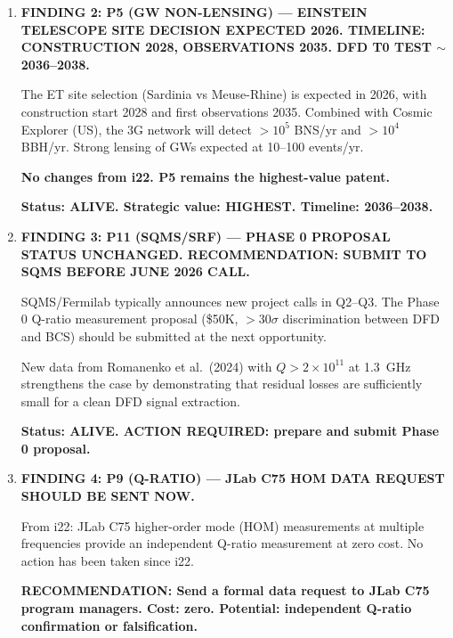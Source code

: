 \documentclass[11pt]{article}
\newcommand{\ee}[1]{\times 10^{#1}}
\begin{document}
\begin{tcolorbox}[colback=blue!5!white, colframe=blue!70!black,
  title=\textbf{W4i23 TOP 5 FINDINGS --- PATENT TEAM}]
\begin{enumerate}
  \textbf{FLAG: HIGH PRIORITY for author clarification.  The screening
  function is the key theoretical ingredient for ALL clock predictions
  and the 3000:1 ratio.  If $\Sigma$ changes, ALL numerical predictions
  change.}

  \textbf{Grade: B$-$ (serious derivation attempt; honest negative
  result identifies a gap).}

\item \textbf{FINDING 2: P5 (GW NON-LENSING) --- EINSTEIN TELESCOPE
  SITE DECISION EXPECTED 2026.  TIMELINE: CONSTRUCTION 2028,
  OBSERVATIONS 2035.  DFD T0 TEST $\sim$2036--2038.}

  The ET site selection (Sardinia vs Meuse-Rhine) is expected in 2026,
  with construction start 2028 and first observations 2035.  Combined
  with Cosmic Explorer (US), the 3G network will detect $>10^5$ BNS/yr
  and $>10^4$ BBH/yr.  Strong lensing of GWs expected at 10--100
  events/yr.

  \textbf{No changes from i22.  P5 remains the highest-value patent.}

  \textbf{Status: ALIVE.  Strategic value: HIGHEST.  Timeline: 2036--2038.}

\item \textbf{FINDING 3: P11 (SQMS/SRF) --- PHASE 0 PROPOSAL STATUS
  UNCHANGED.  RECOMMENDATION: SUBMIT TO SQMS BEFORE JUNE 2026 CALL.}

  SQMS/Fermilab typically announces new project calls in Q2--Q3.
  The Phase 0 Q-ratio measurement proposal (\$50K, $>30\sigma$
  discrimination between DFD and BCS) should be submitted at the
  next opportunity.

  New data from Romanenko et al.\ (2024) with $Q > 2\ee{11}$ at
  1.3~GHz strengthens the case by demonstrating that residual losses
  are sufficiently small for a clean DFD signal extraction.

  \textbf{Status: ALIVE.  ACTION REQUIRED: prepare and submit
  Phase 0 proposal.}

\item \textbf{FINDING 4: P9 (Q-RATIO) --- JLab C75 HOM DATA REQUEST
  SHOULD BE SENT NOW.}

  From i22: JLab C75 higher-order mode (HOM) measurements at multiple
  frequencies provide an independent Q-ratio measurement at zero cost.
  No action has been taken since i22.

  \textbf{RECOMMENDATION: Send a formal data request to JLab C75
  program managers.  Cost: zero.  Potential: independent Q-ratio
  confirmation or falsification.}


\end{enumerate}
\end{tcolorbox}
\end{document}
